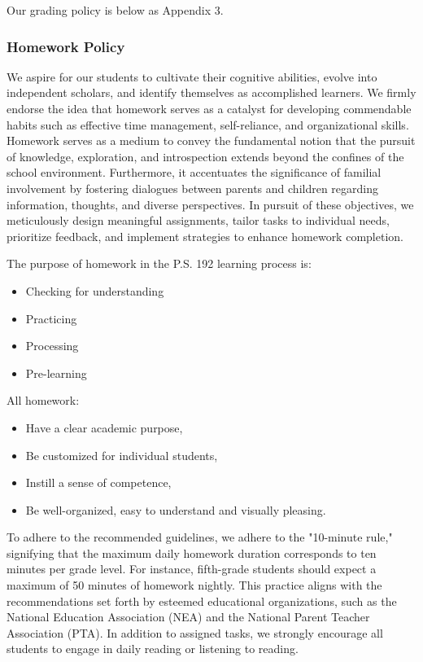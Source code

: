 \documentclass[11pt, letterpaper]{article}
\begin{document}
Our grading policy is below as Appendix 3.

\subsubsection{Homework Policy}
We aspire for our students to cultivate their cognitive abilities, evolve into independent scholars, and identify themselves as accomplished learners. We firmly endorse the idea that homework serves as a catalyst for developing commendable habits such as effective time management, self-reliance, and organizational skills. Homework serves as a medium to convey the fundamental notion that the pursuit of knowledge, exploration, and introspection extends beyond the confines of the school environment. Furthermore, it accentuates the significance of familial involvement by fostering dialogues between parents and children regarding information, thoughts, and diverse perspectives. In pursuit of these objectives, we meticulously design meaningful assignments, tailor tasks to individual needs, prioritize feedback, and implement strategies to enhance homework completion.

The purpose of homework in the P.S. 192 learning process is:
\begin{itemize}
\item Checking for understanding
\item Practicing
\item Processing
\item Pre-learning
\end{itemize}

All homework:
\begin{itemize}
\item Have a clear academic purpose,
\item Be customized for individual students,
\item Instill a sense of competence,
\item Be well-organized, easy to understand and visually pleasing.
\end{itemize}

To adhere to the recommended guidelines, we adhere to the "10-minute rule," signifying that the maximum daily homework duration corresponds to ten minutes per grade level. For instance, fifth-grade students should expect a maximum of 50 minutes of homework nightly. This practice aligns with the recommendations set forth by esteemed educational organizations, such as the National Education Association (NEA) and the National Parent Teacher Association (PTA). In addition to assigned tasks, we strongly encourage all students to engage in daily reading or listening to reading.
\end{document}
